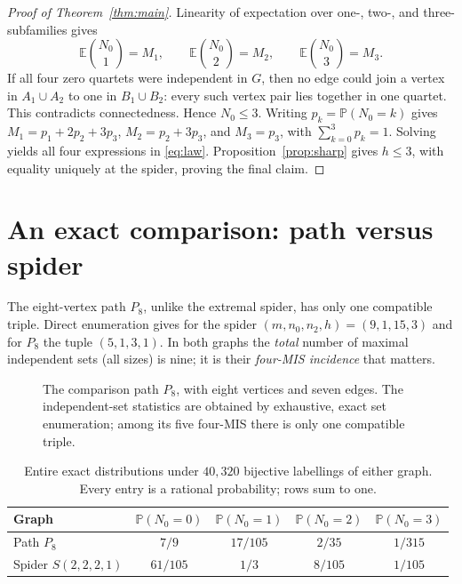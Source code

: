 \documentclass[12pt,a4paper]{article}
\newcommand{\PP}{\mathbb P}
\newcommand{\EE}{\mathbb E}
\newcommand{\bin}[2]{\binom{#1}{#2}}
\begin{document}
\begin{proof}[Proof of Theorem~\ref{thm:main}]
Linearity of expectation over one-, two-, and three-subfamilies gives
\[
 \EE\bin{N_0}{1}=M_1,\qquad\EE\bin{N_0}{2}=M_2,\qquad\EE\bin{N_0}{3}=M_3.
\]
If all four zero quartets were independent in $G$, then no edge could join a vertex in $A_1\cup A_2$ to one in $B_1\cup B_2$: every such vertex pair lies together in one quartet. This contradicts connectedness. Hence $N_0\le3$. Writing $p_k=\PP(N_0=k)$ gives $M_1=p_1+2p_2+3p_3$, $M_2=p_2+3p_3$, and $M_3=p_3$, with $\sum_{k=0}^3p_k=1$. Solving yields all four expressions in \eqref{eq:law}. Proposition~\ref{prop:sharp} gives $h\le3$, with equality uniquely at the spider, proving the final claim.
\end{proof}

\section{An exact comparison: path versus spider}\label{sec:examples}
The eight-vertex path $P_8$, unlike the extremal spider, has only one compatible triple. Direct enumeration gives for the spider $(m,n_0,n_2,h)=(9,1,15,3)$ and for $P_8$ the tuple $(5,1,3,1)$. In both graphs the \emph{total} number of maximal independent sets (all sizes) is nine; it is their \emph{four-MIS incidence} that matters.

\begin{figure}[htbp]\centering
{}
\caption{The comparison path $P_8$, with eight vertices and seven edges. The independent-set statistics are obtained by exhaustive, exact set enumeration; among its five four-MIS there is only one compatible triple.}\label{fig:path}
\end{figure}

\begin{table}[htbp]\centering
\caption{Entire exact distributions under $40{,}320$ bijective labellings of either graph. Every entry is a rational probability; rows sum to one.}\label{tab:examples}
\begin{tabular}{lcccc}\toprule
Graph & $\PP(N_0=0)$ & $\PP(N_0=1)$ & $\PP(N_0=2)$ & $\PP(N_0=3)$\\\midrule
Path $P_8$ & $7/9$ & $17/105$ & $2/35$ & $1/315$\\
Spider $S(2,2,2,1)$ & $61/105$ & $1/3$ & $8/105$ & $1/105$\\\bottomrule
\end{tabular}
\end{table}
\end{document}

